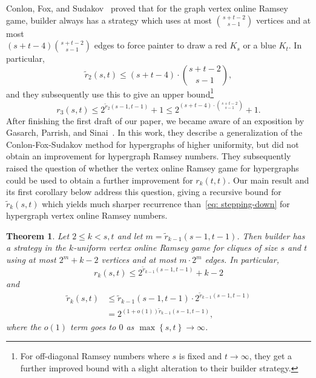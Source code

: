 \documentclass[A4paper,reqno,oneside,12pt]{amsart}
\theoremstyle{plain}
\newtheorem{theorem}{Theorem}
\theoremstyle{definition}
\newcommand{\set}[1]{\left\{ #1 \right\}}
\begin{document}
Conlon, Fox, and Sudakov~\cite[Lemma 2.2]{CFS10} proved that for the graph vertex online Ramsey game, builder always has a strategy which uses at most $\binom{s+t-2}{s-1}$ vertices and at most\\
$(s+t-4)\binom{s+t-2}{s-1}$ edges to force painter to draw a red $K_s$ or a blue $K_t$.
In particular,
\begin{equation}
\label{eq: CFS-2-uniform-online}
    \tilde{r}_2(s,t) \leq (s+t-4) \cdot \binom{s+t-2}{s-1},
\end{equation}
and they subsequently use this to give an upper bound\footnote{For off-diagonal Ramsey numbers where $s$ is fixed and $t \to \infty$, they get a further improved bound with a slight alteration to their builder strategy.}
\begin{equation}
\label{eq: CFS-3-uniform}
    r_3(s,t) \leq 2^{\tilde{r}_2(s-1,t-1)} +1 \leq 2^{(s+t-4) \cdot \binom{s+t-2}{s-1}} + 1.
\end{equation}
After finishing the first draft of our paper, we became aware of an exposition by Gasarch, Parrish, and Sinai~\cite{GPS}. In this work, they describe a generalization of the Conlon-Fox-Sudakov method for hypergraphs of higher uniformity, but did not obtain an improvement for hypergraph Ramsey numbers. They subsequently raised the question of whether the vertex online Ramsey game for hypergraphs could be used to obtain a further improvement for $r_k(t,t)$.
Our main result and its first corollary below address this question, giving a recursive bound for $\tilde{r}_k(s,t)$ which yields much sharper recurrence than~\eqref{eq: stepping-down} for hypergraph vertex online Ramsey numbers.
\begin{theorem}
\label{thm: online bound}
    Let $2 \leq k < s, t$ and let $m = \tilde{r}_{k-1}(s-1,t-1)$.
    Then builder has a strategy in the $k$-uniform vertex online Ramsey game for cliques of size $s$ and $t$ using at most $2^m + k - 2$ vertices and at most $m \cdot 2^m$ edges.
    In particular,
    \begin{equation}
    \label{eq: ramsey-bound}
        r_k(s,t) \leq 2^{\tilde{r}_{k-1}(s-1,t-1)} + k - 2
    \end{equation}
    and
    \begin{equation}
    \begin{split}
    \label{eq: online bound}
        \tilde{r}_k(s,t) 
        &\leq \tilde{r}_{k-1}(s-1,t-1) \cdot 2^{\tilde{r}_{k-1}(s-1,t-1)} \\[1 ex]
        &= 2^{(1+o(1))\tilde{r}_{k-1}(s-1,t-1)},
    \end{split}
    \end{equation}
    where the $o(1)$ term goes to $0$ as $\max\set{s,t}\to\infty$.
\end{theorem}
\end{document}
